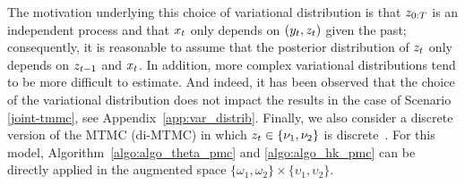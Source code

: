 The motivation underlying this choice of variational distribution 
is that $z_{0:T}$
is an independent process and that $x_t$ only depends
on $(y_t,z_t)$ given the past; consequently, it is
reasonable to assume that the posterior distribution
of $z_t$ only depends on $z_{t-1}$ and $x_t$. In addition, more complex variational distributions tend to be more difficult to estimate. And indeed, it has been observed that the choice of the variational distribution does not impact the results in the case
of Scenario \eqref{joint-tmmc}, see Appendix~\ref{app:var_distrib}.
Finally, we also consider
a discrete version of the MTMC (di-MTMC)
in which $z_t \in \{\nu_1,\nu_2\}$ is 
discrete~\citep{gorynin2018assessing, li2019adaptive, chen2020modeling}. 
For this model, Algorithm~\ref{algo:algo_theta_pmc}
and  \ref{algo:algo_hk_pmc}
 can be directly applied in the augmented 
 space $\{\omega_1,\omega_2\} \times \{\upsilon_1,\upsilon_2\}$.


%



